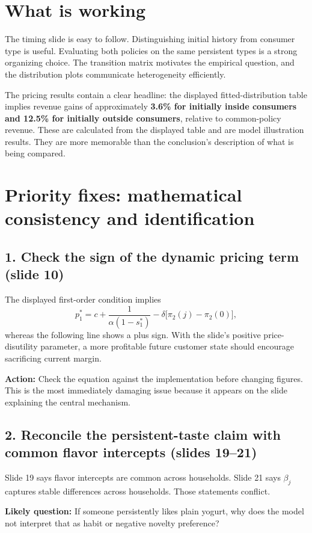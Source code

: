 \documentclass[11pt]{article}
\begin{document}
\section{What is working}
The timing slide is easy to follow. Distinguishing initial history from consumer type is useful. Evaluating both policies on the same persistent types is a strong organizing choice. The transition matrix motivates the empirical question, and the distribution plots communicate heterogeneity efficiently.

The pricing results contain a clear headline: the displayed fitted-distribution table implies revenue gains of approximately \textbf{3.6\% for initially inside consumers and 12.5\% for initially outside consumers}, relative to common-policy revenue. These are calculated from the displayed table and are model illustration results. They are more memorable than the conclusion's description of what is being compared.

\newpage
\section{Priority fixes: mathematical consistency and identification}

\subsection{1. Check the sign of the dynamic pricing term (slide 10)}
The displayed first-order condition implies
\[
 p_1^*=c+\frac{1}{\alpha(1-s_1^*)}
       -\delta\bigl[\pi_2(j)-\pi_2(0)\bigr],
\]
whereas the following line shows a plus sign. With the slide's positive price-disutility parameter, a more profitable future customer state should encourage sacrificing current margin.

\textbf{Action:} Check the equation against the implementation before changing figures. This is the most immediately damaging issue because it appears on the slide explaining the central mechanism.

\subsection{2. Reconcile the persistent-taste claim with common flavor intercepts (slides 19--21)}
Slide 19 says flavor intercepts are common across households. Slide 21 says $\beta_j$ captures stable differences across households. Those statements conflict.

\textbf{Likely question:} If someone persistently likes plain yogurt, why does the model not interpret that as habit or negative novelty preference?
\end{document}

